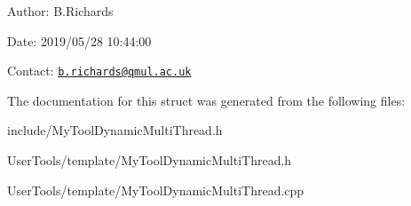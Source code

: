 \begin{DoxyParagraph}{Author\-:}
B.\-Richards 
\end{DoxyParagraph}
\begin{DoxyParagraph}{Date\-:}
2019/05/28 10\-:44\-:00 
\end{DoxyParagraph}
Contact\-: \href{mailto:b.richards@qmul.ac.uk}{\tt b.\-richards@qmul.\-ac.\-uk} 

The documentation for this struct was generated from the following files\-:\begin{DoxyCompactItemize}
\item 
include/My\-Tool\-Dynamic\-Multi\-Thread.\-h\item 
User\-Tools/template/My\-Tool\-Dynamic\-Multi\-Thread.\-h\item 
User\-Tools/template/My\-Tool\-Dynamic\-Multi\-Thread.\-cpp\end{DoxyCompactItemize}
